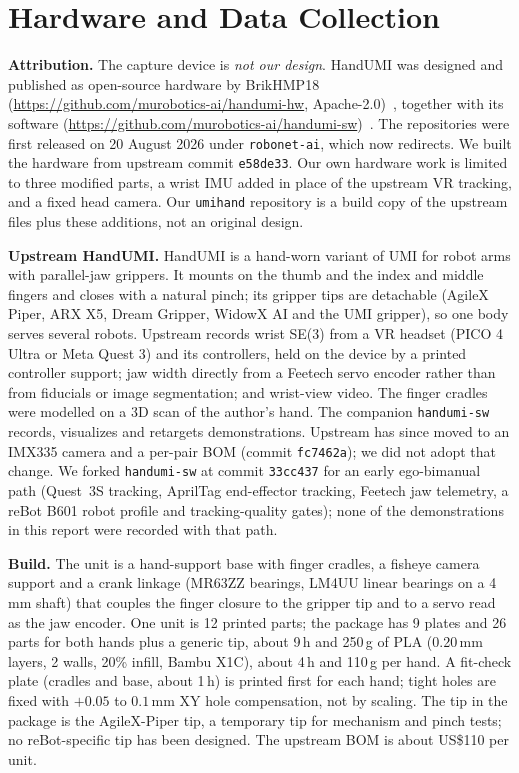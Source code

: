 \documentclass[conference,10pt]{IEEEtran}
\newcommand{\mm}{\,mm\xspace}
\begin{document}
\section{Hardware and Data Collection}\label{sec:hw}
\textbf{Attribution.} The capture device is \emph{not our design}. HandUMI was designed and published as open-source hardware by
BrikHMP18 (\url{https://github.com/murobotics-ai/handumi-hw}, Apache-2.0)~\cite{handumi_hw}, together with its software
(\url{https://github.com/murobotics-ai/handumi-sw})~\cite{handumi_sw}. The repositories were first released on 20 August 2026
under \texttt{robonet-ai}, which now redirects. We built the hardware from upstream commit \texttt{e58de33}. Our own hardware
work is limited to three modified parts, a wrist IMU added in place of the upstream VR tracking, and a fixed head camera. Our
\texttt{umihand} repository is a build copy of the upstream files plus these additions, not an original design.

\textbf{Upstream HandUMI.} HandUMI is a hand-worn variant of UMI for robot arms with parallel-jaw grippers. It mounts on the
thumb and the index and middle fingers and closes with a natural pinch; its gripper tips are detachable (AgileX Piper, ARX X5,
Dream Gripper, WidowX AI and the UMI gripper), so one body serves several robots. Upstream records wrist SE(3) from a VR
headset (PICO 4 Ultra or Meta Quest 3) and its controllers, held on the device by a printed controller support; jaw width
directly from a Feetech servo encoder rather than from fiducials or image segmentation; and wrist-view video. The finger
cradles were modelled on a 3D scan of the author's hand. The companion \texttt{handumi-sw} records, visualizes and retargets
demonstrations. Upstream has since moved to an IMX335 camera and a per-pair BOM (commit \texttt{fc7462a}); we did not adopt
that change. We forked \texttt{handumi-sw} at commit \texttt{33cc437} for an early ego-bimanual path (Quest~3S tracking,
AprilTag end-effector tracking, Feetech jaw telemetry, a reBot B601 robot profile and tracking-quality gates); none of the
demonstrations in this report were recorded with that path.

\textbf{Build.} The unit is a hand-support base with finger cradles, a fisheye camera support and a crank linkage (MR63ZZ
bearings, LM4UU linear bearings on a 4\mm shaft) that couples the finger closure to the gripper tip and to a servo read as
the jaw encoder. One unit is 12 printed parts; the package has 9 plates and 26 parts for both hands plus a generic tip, about
9\,h and 250\,g of PLA (0.20\mm layers, 2 walls, 20\% infill, Bambu X1C), about 4\,h and 110\,g per hand. A fit-check plate
(cradles and base, about 1\,h) is printed first for each hand; tight holes are fixed with $+0.05$ to $0.1$\mm XY hole
compensation, not by scaling. The tip in the package is the AgileX-Piper tip, a temporary tip for mechanism and pinch tests;
no reBot-specific tip has been designed. The upstream BOM is about US\$110 per unit.
\end{document}
